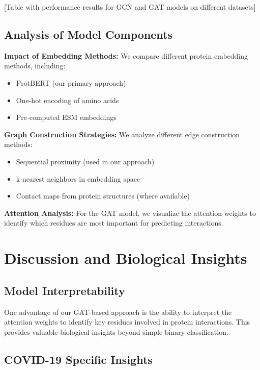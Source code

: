 \documentclass[12pt,a4paper]{article}
\begin{document}
[Table with performance results for GCN and GAT models on different datasets]

\subsection{Analysis of Model Components}
\label{sec:analysis}

\textbf{Impact of Embedding Methods:} We compare different protein embedding methods, including:
\begin{itemize}
    \item ProtBERT (our primary approach)
    \item One-hot encoding of amino acids
    \item Pre-computed ESM embeddings
\end{itemize}

\textbf{Graph Construction Strategies:} We analyze different edge construction methods:
\begin{itemize}
    \item Sequential proximity (used in our approach)
    \item k-nearest neighbors in embedding space
    \item Contact maps from protein structures (where available)
\end{itemize}

\textbf{Attention Analysis:} For the GAT model, we visualize the attention weights to identify which residues are most important for predicting interactions.

\section{Discussion and Biological Insights}
\label{sec:discussion}

\subsection{Model Interpretability}
\label{sec:interpretability}

One advantage of our GAT-based approach is the ability to interpret the attention weights to identify key residues involved in protein interactions. This provides valuable biological insights beyond simple binary classification.

\subsection{COVID-19 Specific Insights}
\label{sec:covid_insights}
\end{document}
